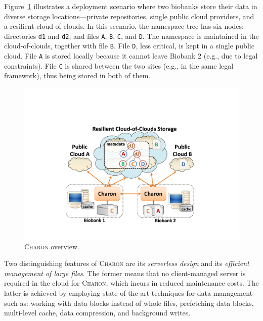 Figure~\ref{fig:charon} illustrates a deployment scenario where two biobanks store their data in diverse storage locations---private repositories, single public cloud providers, and a resilient cloud-of-clouds.
In this scenario, the namespace tree has six nodes: directories \texttt{d1} and \texttt{d2}, and files \texttt{A}, \texttt{B}, \texttt{C}, and \texttt{D}.
The namespace is maintained in the cloud-of-clouds, together with file \texttt{B}.
File \texttt{D}, less critical, is kept in a single public cloud.
File \texttt{A} is stored locally because it cannot leave Biobank 2 (e.g., due to legal constraints).
File \texttt{C} is shared between the two sites (e.g., in the same legal framework), thus being stored in both of them.

\begin{figure}[ht]
 \centering
 \includegraphics[width=0.6\columnwidth]{./imgs/charon_arch.pdf}
\caption{\small \textsc{Charon} overview.}
\label{fig:charon}
\end{figure}

Two distinguishing features of \textsc{Charon} are its \emph{serverless design} and its \emph{efficient management of large files}.
The former means that no client-managed server is required in the cloud for \textsc{Charon}, which incurs in reduced maintenance costs.
The latter is achieved by employing state-of-the-art techniques for data management such as: working with data blocks instead of whole files, prefetching data blocks, multi-level cache, data compression, and background writes.
